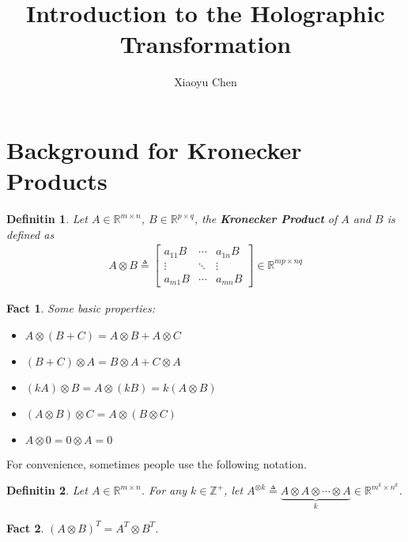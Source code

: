 \documentclass{article}
\title{Introduction to the Holographic Transformation}
\author{Xiaoyu Chen}
\date{}
\newtheorem{definition}{Definitin}[section]
\newtheorem{fact}{Fact}[section]
\begin{document}
\maketitle

\section{Background for Kronecker Products}
\begin{definition}
  Let $A \in \mathbb{R}^{m\times n}$, $B \in \mathbb{R}^{p\times q}$,
  the \textbf{Kronecker Product} of $A$ and $B$ is defined as
  \begin{align*}
    A \otimes B \triangleq \left[
    \begin{array}{ccc}
      a_{11}B & \cdots & a_{1n}B \\
      \vdots & \ddots & \vdots \\
      a_{m1}B & \cdots & a_{mn}B
    \end{array}
    \right] \in \mathbb{R}^{mp \times nq}
  \end{align*}
\end{definition}

\begin{fact}
  Some basic properties:
  \begin{itemize}
  \item $A\otimes (B + C) = A\otimes B + A\otimes C$
  \item $(B+C)\otimes A = B\otimes A + C\otimes A$
  \item $(kA)\otimes B = A\otimes (kB) = k(A\otimes B)$
  \item $(A\otimes B)\otimes C = A \otimes (B\otimes C)$
  \item $A\otimes 0 = 0\otimes A = 0$
  \end{itemize}
\end{fact}

For convenience, sometimes people use the following notation.
\begin{definition}
  Let $A \in \mathbb{R}^{m\times n}$.
  For any $k \in \mathbb{Z}^+$, let $A^{\otimes k} \triangleq \underbrace{A\otimes A \otimes \cdots \otimes A}_{k} \in \mathbb{R}^{m^k \times n^k}$.
\end{definition}

\begin{fact}
  $(A\otimes B)^T = A^T \otimes B^T$.
\end{fact}
\end{document}
